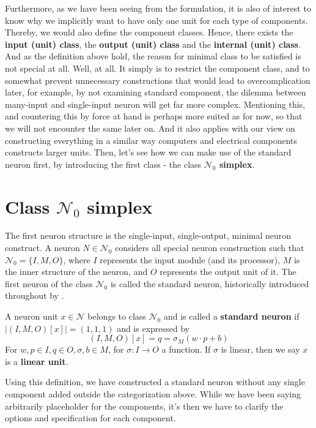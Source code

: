 Furthermore, as we have been seeing from the formulation, it is also of interest to know why we implicitly want to have only one unit for each type of components. Thereby, we would also define the component classes. Hence, there exists the \textbf{input (unit) class}, the \textbf{output (unit) class} and the \textbf{internal (unit) class}. And as the definition above hold, the reason for minimal class to be satisfied is not special at all. Well, at all. It simply is to restrict the component class, and to somewhat prevent unnecessary constructions that would lead to overcomplication later, for example, by not examining standard component, the dilemma between many-input and single-input neuron will get far more complex. Mentioning this, and countering this by force at hand is perhaps more suited as for now, so that we will not encounter the same later on. And it also applies with our view on constructing everything in a similar way computers and electrical components constructs larger units. Then, let's see how we can make use of the standard neuron first, by introducing the first class - the class \textbf{$\mathcal{N}_{0}$ simplex}. 
\section{Class $\mathcal{N}_{0}$ simplex}
The first neuron structure is the single-input, single-output, minimal neuron construct. A neuron $N\in \mathcal{N}_{0}$ considers all special neuron construction such that $\mathcal{N}_{0}=\{I,M,O\}$, where $I$ represents the input module (and its processor), $M$ is the inner structure of the neuron, and $O$ represents the output unit of it. The first neuron of the class $\mathcal{N}_{0}$ is called the standard neuron, historically introduced throughout by \cite{mcculloch_logical_1943,nakkiran_deep_2019,goodfellow2016deep}. 
\begin{definition}
    A neuron unit $x\in \mathcal{N}$ belongs to class $\mathcal{N}_{0}$ and is called a \textbf{standard neuron} if $\lvert (I,M,O)[x]\rvert = (1,1,1)$ and is expressed by \begin{equation}
        (I,M,O)[x] = q = \sigma_{M}(w\cdot p + b)
    \end{equation}
    For $w,p\in I, q\in O, \sigma, b \in M$, for $\sigma: I\to O$ a function. If $\sigma$ is linear, then we say $x$ is a \textbf{linear unit}. 
\end{definition}
Using this definition, we have constructed a standard neuron without any single component added outside the categorization above. While we have been saying arbitrarily placeholder for the components, it's then we have to clarify the options and specification for each component.